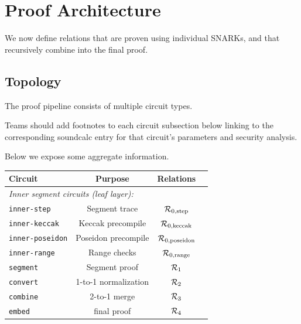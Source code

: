 \section{Proof Architecture}\label{sec:proof-arch}
We now define relations that are proven using individual SNARKs, and that recursively combine into the final proof.

\subsection{Topology}

The proof pipeline consists of multiple circuit types.

\begin{instruction}
Teams should add footnotes to each circuit subsection below linking to the corresponding soundcalc entry for that circuit's parameters and security analysis.
\end{instruction}

Below we expose some aggregate information.

\begin{center}
\begin{tabular}{lccc}
\hline
\textbf{Circuit} & \textbf{Purpose} & Relations\\
\hline
\multicolumn{3}{l}{\emph{Inner segment circuits (leaf layer):}}\\
\quad\texttt{inner-step} & Segment trace & $\mathcal{R}_{0,\mathrm{step}}$ \\
\quad\texttt{inner-keccak} & Keccak precompile & $\mathcal{R}_{0,\mathrm{keccak}}$ \\
\quad\texttt{inner-poseidon} & Poseidon precompile & $\mathcal{R}_{0,\mathrm{poseidon}}$ \\
\quad\texttt{inner-range} & Range checks & $\mathcal{R}_{0,\mathrm{range}}$ \\
\hline
\texttt{segment}   & Segment proof       & $\mathcal{R}_1$ \\
\texttt{convert}  & 1-to-1 normalization & $\mathcal{R}_2$ \\
\texttt{combine}  & 2-to-1 merge     & $\mathcal{R}_3$ \\
\texttt{embed}    & final proof      & $\mathcal{R}_4$ \\
\hline
\end{tabular}
\end{center}


